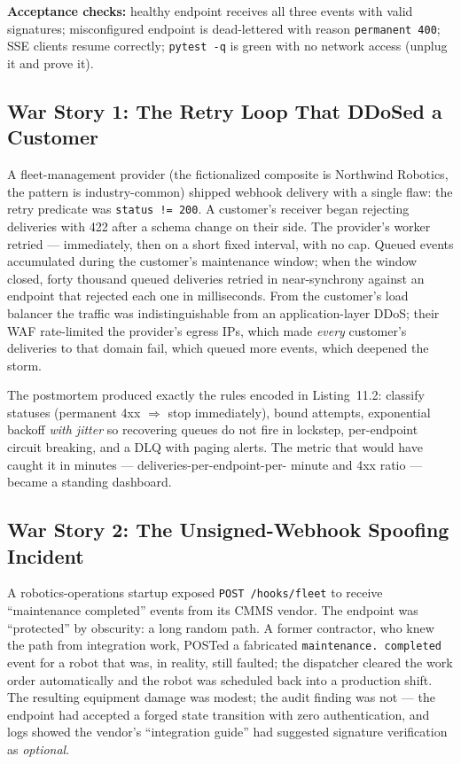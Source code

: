 \textbf{Acceptance checks:} healthy endpoint receives all three events with
valid signatures; misconfigured endpoint is dead-lettered with reason
\texttt{permanent 400}; SSE clients resume correctly; \texttt{pytest -q} is
green with no network access (unplug it and prove it).

\subsection{War Story 1: The Retry Loop That DDoSed a Customer}

A fleet-management provider (the fictionalized composite is Northwind
Robotics, the pattern is industry-common) shipped webhook delivery with a
single flaw: the retry predicate was \texttt{status != 200}. A customer's
receiver began rejecting deliveries with 422 after a schema change on their
side. The provider's worker retried --- immediately, then on a short fixed
interval, with no cap. Queued events accumulated during the customer's
maintenance window; when the window closed, forty thousand queued deliveries
retried in near-synchrony against an endpoint that rejected each one in
milliseconds. From the customer's load balancer the traffic was
indistinguishable from an application-layer DDoS; their WAF rate-limited the
provider's egress IPs, which made \emph{every} customer's deliveries to that
domain fail, which queued more events, which deepened the storm.

The postmortem produced exactly the rules encoded in Listing~11.2: classify
statuses (permanent 4xx $\Rightarrow$ stop immediately), bound attempts,
exponential backoff \emph{with jitter} so recovering queues do not fire in
lockstep, per-endpoint circuit breaking, and a DLQ with paging alerts. The
metric that would have caught it in minutes --- deliveries-per-endpoint-per-
minute and 4xx ratio --- became a standing dashboard.

\subsection{War Story 2: The Unsigned-Webhook Spoofing Incident}

A robotics-operations startup exposed \texttt{POST /hooks/fleet} to receive
``maintenance completed'' events from its CMMS vendor. The endpoint was
``protected'' by obscurity: a long random path. A former contractor, who knew
the path from integration work, POSTed a fabricated \texttt{maintenance.
completed} event for a robot that was, in reality, still faulted; the
dispatcher cleared the work order automatically and the robot was scheduled
back into a production shift. The resulting equipment damage was modest; the
audit finding was not --- the endpoint had accepted a forged state transition
with zero authentication, and logs showed the vendor's ``integration guide''
had suggested signature verification as \emph{optional}.

